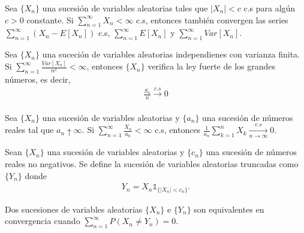 \begin{cor}
    Sea $\{X_n\}$ una sucesión de variables aleatorias tales que $|X_n| < c$ c.s para algún $c>0$ constante. Si $\sum_{n=1}^{\infty} X_n < \infty$ c.s, entonces también convergen las series $\sum_{n=1}^{\infty}(X_n - E[X_n])$ c.s, $\sum_{n=1}^{\infty}E[X_n]$ y $\sum_{n=1}^{\infty} Var[X_n]$.
\end{cor}

\begin{teo}
    Sea $\{X_n\}$ una suceción de variables aleatorias independienes con varianza finita. Si $\sum_{n=1}^{\infty} \frac{Var[X_n]}{n^2} < \infty$, entonces $\{X_n\}$ verifica la ley fuerte de los grandes números, es decir,
    \begin{align*}
        \frac{S_n}{n} \xrightarrow[]{c.s} 0
    \end{align*}
\end{teo}

\begin{lema}[Kronecker]
    Sea $\{X_n\}$ una sucesión de variables aleatorias y $\{a_n\}$ una sucesión de números reales tal que $a_n \uparrow \infty$. Si $\sum_{n=1}^{\infty} \frac{X_n}{a_n} < \infty$ c.s, entonces $\frac{1}{a_n} \sum_{k=1}^{n} X_k \xrightarrow[n\to \infty]{c.s} 0$. 
\end{lema}

\begin{defi}
    Sean $\{X_n\}$ una sucesión de variables aleatorias y $\{c_n\}$ una sucesión de números reales no negativos. Se define la sucesión de variables aleatorias truncadas como $\{Y_n\}$  donde
    \begin{align*}
        Y_n = X_n \mathbb{1}_{\{|X_n| < c_n\}}.
    \end{align*}
\end{defi}

\begin{defi}
    Dos sucesiones de variables aleatorias $\{X_n\}$ e $\{Y_n\}$ son equivalentes en convergencia cuando $\sum_{n=1}^{\infty} P(X_n \not = Y_n) = 0$.
\end{defi}

